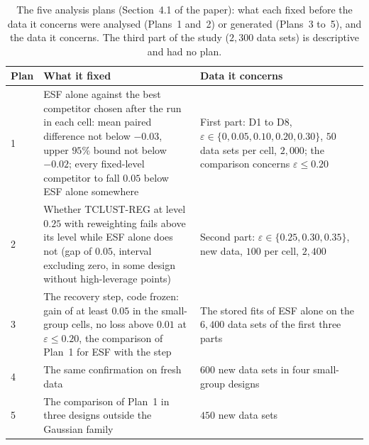 \begin{table}[htbp]
\centering
\scriptsize
\caption{The five analysis plans (Section~4.1 of the paper): what each fixed before the data it concerns were analysed
(Plans~1 and~2) or generated (Plans~3 to~5), and the data it concerns. The third part of the
study ($2{,}300$ data sets) is descriptive and had no plan.}
\label{tab:plans}
\begin{tabular}{@{}lp{6.5cm}p{5.0cm}@{}}
\toprule
Plan & What it fixed & Data it concerns \\
\midrule
1 & ESF alone against the best competitor chosen after the run in each cell: mean paired
difference not below $-0.03$, upper $95\%$ bound not below $-0.02$; every fixed-level
competitor to fall $0.05$ below ESF alone somewhere & First part: D1 to D8,
$\varepsilon\in\{0,0.05,0.10,0.20,0.30\}$, $50$ data sets per cell, $2{,}000$; the comparison
concerns $\varepsilon\le0.20$ \\
2 & Whether TCLUST-REG at level $0.25$ with reweighting fails above its level while ESF alone
does not (gap of $0.05$, interval excluding zero, in some design without high-leverage points)
& Second part: $\varepsilon\in\{0.25,0.30,0.35\}$, new data, $100$ per cell, $2{,}400$ \\
3 & The recovery step, code frozen: gain of at least $0.05$ in the small-group cells, no loss
above $0.01$ at $\varepsilon\le0.20$, the comparison of Plan~1 for ESF with the step & The
stored fits of ESF alone on the $6{,}400$ data sets of the first three parts \\
4 & The same confirmation on fresh data & $600$ new data sets in four small-group designs \\
5 & The comparison of Plan~1 in three designs outside the Gaussian family & $450$ new data sets \\
\bottomrule
\end{tabular}
\end{table}

\begin{table}[htbp]
\centering
\footnotesize
\caption{Sensitivity of the recovery step to its noise range (descriptive; Section~4.6 of the
paper): the range $R$, $1.1$ times the range of the response, multiplied by $2$ and $5$, as if
the most extreme unit lay two or five times farther out, and replaced by two ranges tied to the
fitted scales ($20$ median group scales; the range of the unflagged units plus $10$ median
scales); mean over cells of the mean accuracy
on clean units, the number of cells with a mean below $0.85$, and the worst cell, over the same
$123$ cells as Table~2 of the paper. Fits and seeds as in the study.}
\label{tab:S48}
\resizebox{\textwidth}{!}{}
\end{table}

